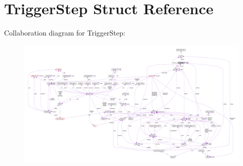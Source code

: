 \hypertarget{structTriggerStep}{}\section{Trigger\+Step Struct Reference}
\label{structTriggerStep}


Collaboration diagram for Trigger\+Step\+:\nopagebreak
\begin{figure}[H]
\begin{center}
\leavevmode
\includegraphics[width=350pt]{structTriggerStep__coll__graph}
\end{center}
\end{figure}
